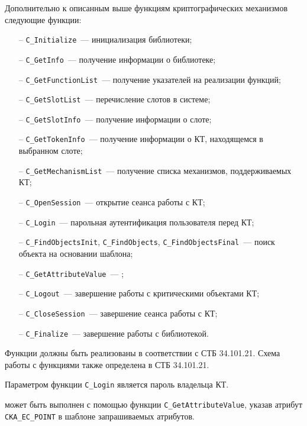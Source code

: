 Дополнительно к описанным выше функциям криптографических механизмов 
 следующие функции:
\begin{itemize}
\item[--]
\verb|C_Initialize|~--- инициализация библиотеки;
\item[--] 
\verb|C_GetInfo|~--- получение информации о библиотеке;
\item[--] 
\verb|C_GetFunctionList|~--- получение указателей на реализации функций;
\item[--]
\verb|C_GetSlotList|~--- перечисление слотов в системе;
\item[--]
\verb|C_GetSlotInfo|~--- получение информации о слоте;
\item[--]
\verb|C_GetTokenInfo|~--- получение информации о КТ, находящемся в 
выбранном слоте;
\item[--]
\verb|C_GetMechanismList|~--- 
получение списка механизмов, поддерживаемых КТ;
\item[--]
\verb|C_OpenSession|~--- открытие сеанса работы с КТ;
\item[--]
\verb|C_Login|~--- парольная аутентификация пользователя перед КТ;
\item[--]
\verb|C_FindObjectsInit|, \verb|C_FindObjects|, 
\verb|C_FindObjectsFinal|~---
поиск объекта на основании шаблона;
\item[--]
\verb|C_GetAttributeValue|~--- ;
\item[--]
\verb|C_Logout|~--- завершение работы с критическими объектами КТ;
\item[--]
\verb|C_CloseSession|~--- завершение сеанса работы с КТ;
\item[--]
\verb|C_Finalize|~--- завершение работы с библиотекой.
\end{itemize}

Функции должны быть реализованы в соответствии с СТБ 34.101.21.
Схема работы с функциями также определена в СТБ 34.101.21.

Параметром функции \verb|C_Login| является пароль владельца КТ.

 может быть выполнен
с помощью функции \verb|C_GetAttributeValue|, указав атрибут
\verb|CKA_EC_POINT| в шаблоне запрашиваемых атрибутов.

